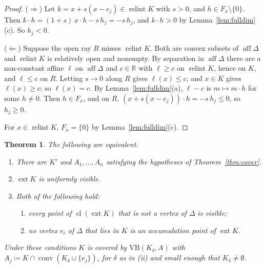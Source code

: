 \documentclass[11pt]{article}
\newcommand{\R}{\mathbb{R}}
\newcommand{\VB}{\mathrm{VB}}
\DeclareMathOperator{\conv}{conv}
\DeclareMathOperator{\relint}{relint}
\DeclareMathOperator{\aff}{aff}
\DeclareMathOperator{\ext}{ext}
\DeclareMathOperator{\cl}{cl}
\theoremstyle{plain}
\newtheorem{theorem}{Theorem}[section]
\theoremstyle{definition}
\theoremstyle{remark}
\begin{document}
\begin{proof}
($\Rightarrow$) Let $k=x+s(x-e_j)\in\relint K$ with $s>0$, and $h\in F_x\setminus\{0\}$.
Then $k\cdot h=(1+s)\,x\cdot h-s\,h_j=-s\,h_j$, and $k\cdot h>0$ by
Lemma~\ref{lem:fulldim}(c). So $h_j<0$.

($\Leftarrow$) Suppose the open ray $R$ misses $\relint K$. Both are convex subsets of
$\aff\Delta$ and $\relint K$ is relatively open and nonempty. By separation in $\aff\Delta$
\cite[Thm.~11.3]{Rockafellar} there are a non-constant affine $\ell$ on $\aff\Delta$ and
$c\in\R$ with $\ell\ge c$ on $\relint K$, hence on $K$, and $\ell\le c$ on $R$. Letting
$s\to0$ along $R$ gives $\ell(x)\le c$, and $x\in K$ gives $\ell(x)\ge c$; so $\ell(x)=c$.
By Lemma~\ref{lem:fulldim}(a), $\ell-c$ is $m\mapsto m\cdot h$ for some $h\neq0$. Then
$h\in F_x$, and on $R$, $(x+s(x-e_j))\cdot h=-s\,h_j\le0$, so $h_j\ge0$.

For $x\in\relint K$, $F_x=\{0\}$ by Lemma~\ref{lem:fulldim}(c).
\end{proof}

\begin{theorem}\label{thm:vis}
The following are equivalent.
\begin{enumerate}[label=(\roman*)]
  \item There are $K'$ and $A_1,\dots,A_n$ satisfying the hypotheses of
  Theorem~\ref{thm:cover}.
  \item $\ext K$ is uniformly visible.
  \item Both of the following hold:
  \begin{enumerate}[label=(\alph*)]
    \item every point of $\cl(\ext K)$ that is not a vertex of $\Delta$ is visible;
    \item no vertex $e_i$ of $\Delta$ that lies in $K$ is an accumulation point of
    $\ext K$.
  \end{enumerate}
\end{enumerate}
Under these conditions $K$ is covered by $\VB(K_\delta,A)$ with
$A_j\coloneqq K\cap\conv(K_\delta\cup\{e_j\})$, for $\delta$ as in (ii) and small enough
that $K_\delta\neq\emptyset$.
\end{theorem}
\end{document}
